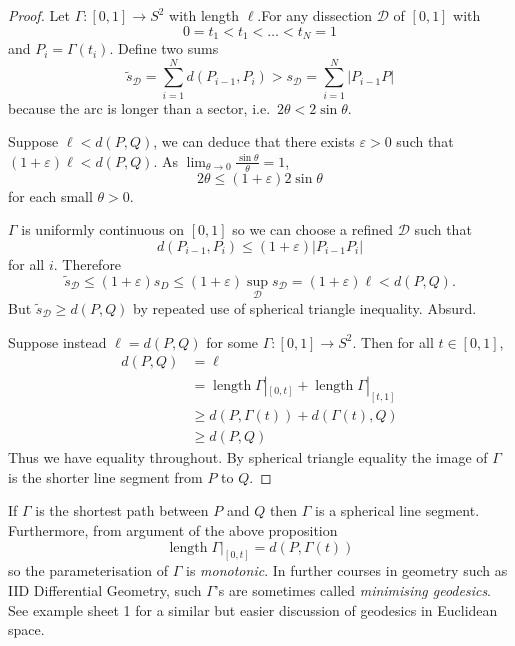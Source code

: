 \documentclass[a4paper]{article}
\begin{document}
\begin{proof}
  Let \(\Gamma: [0, 1] \to S^2\) with length \(\ell\).For any dissection \(\mathcal D\) of \([0, 1]\) with
  \[
    0 = t_1 < t_1 < \dots < t_N = 1
  \]
  and \(P_i = \Gamma(t_i)\). Define two sums
  \[
    \tilde s_{\mathcal D} = \sum_{i = 1}^N d(P_{i -1}, P_i) > s_{\mathcal D} = \sum_{i = 1}^N |P_{i - 1}P|
  \]
  because the arc is longer than a sector, i.e.\ \(2\theta < 2 \sin \theta\).

  Suppose \(\ell < d(P, Q)\), we can deduce that there exists \(\varepsilon > 0\) such that \((1 + \varepsilon)\ell < d(P, Q)\). As \(\lim_{\theta \to 0} \frac{\sin \theta}{\theta} = 1\),
  \[
    2\theta \leq (1 + \varepsilon) 2\sin \theta
  \]
  for each small \(\theta > 0\).

  \(\Gamma\) is uniformly continuous on \([0, 1]\) so we can choose a refined \(\mathcal D\) such that
  \[
    d(P_{i - 1}, P_i) \leq (1 + \varepsilon)|P_{i - 1}P_i|
  \]
  for all \(i\). Therefore
  \[
    \tilde s_{\mathcal D} \leq (1 + \varepsilon)s_D \leq (1 + \varepsilon)\sup_{\mathcal D} s_{\mathcal D} = (1 + \varepsilon) \ell < d(P, Q).
  \]
  But \(\tilde s_{\mathcal D} \geq d(P, Q)\) by repeated use of spherical triangle inequality. Absurd.

  Suppose instead \(\ell = d(P, Q)\) for some \(\Gamma: [0, 1] \to S^2\). Then for all \(t \in [0, 1]\),
  \begin{align*}
    d(P, Q) &= \ell \\
            &= \operatorname{length} \Gamma|_{[0, t]} + \operatorname{length} \Gamma|_{[t, 1]} \\
            &\geq d(P, \Gamma(t)) + d(\Gamma(t), Q) \\
            &\geq d(P, Q) 
  \end{align*}
  Thus we have equality throughout. By spherical triangle equality the image of \(\Gamma\) is the shorter line segment from \(P\) to \(Q\).
\end{proof}

\begin{remark}
  If \(\Gamma\) is the shortest path between \(P\) and \(Q\) then \(\Gamma\) is a spherical line segment. Furthermore, from argument of the above proposition
  \[
    \operatorname{length} \Gamma|_{[0, t]} = d(P, \Gamma(t))
  \]
  so the parameterisation of \(\Gamma\) is \emph{monotonic}. In further courses in geometry such as IID Differential Geometry, such \(\Gamma\)'s are sometimes called \emph{minimising geodesics}. See example sheet 1 for a similar but easier discussion of geodesics in Euclidean space.
\end{remark}
\end{document}
